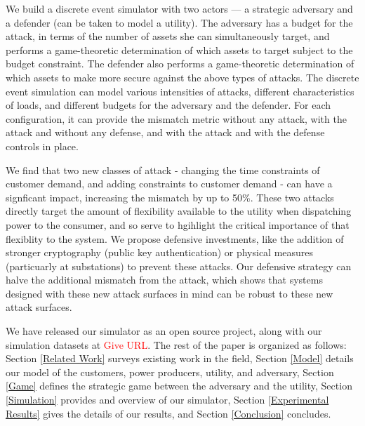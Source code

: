 \documentclass[conference]{IEEEtran}
\begin{document}
We build a discrete event simulator with two actors --- a strategic adversary and a defender (can be taken to model a utility). The adversary has a budget for the attack, in terms of the number of assets she can simultaneously target, and performs a game-theoretic determination of which assets to target subject to the budget constraint. The defender also performs a game-theoretic determination of which assets to make more secure against the above types of attacks. The discrete event simulation can model various intensities of attacks, different characteristics of loads, and different budgets for the adversary and the defender. For each configuration, it can provide the mismatch metric without any attack, with the attack and without any defense, and with the attack and with the defense controls in place. 

We find that two new classes of attack - changing the time constraints of customer demand, and adding constraints to customer demand - can have a signficant impact, increasing the mismatch by up to 50\%.  These two attacks directly target the amount of flexibility available to the utility when dispatching power to the consumer, and so serve to hgihlight the critical importance of that flexiblity to the system.  We propose defensive investments, like the addition of stronger cryptography (public key authentication) or physical measures (particuarly at substations) to prevent these attacks.  Our defensive strategy can halve the additional mismatch from the attack, which shows that systems designed with these new attack surfaces in mind can be robust to these new attack surfaces.  

We have released our simulator as an open source project, along with our simulation datasets at \textcolor{red}{Give URL}.  The rest of the paper is organized as follows: Section \ref{Related Work} surveys existing work in the field, Section \ref{Model} details our model of the customers, power producers, utility, and adversary, Section \ref{Game} defines the strategic game between the adversary and the utility, Section \ref{Simulation} provides and overview of our simulator, Section \ref{Experimental Results} gives the details of our results, and Section \ref{Conclusion} concludes.

\end{document}
